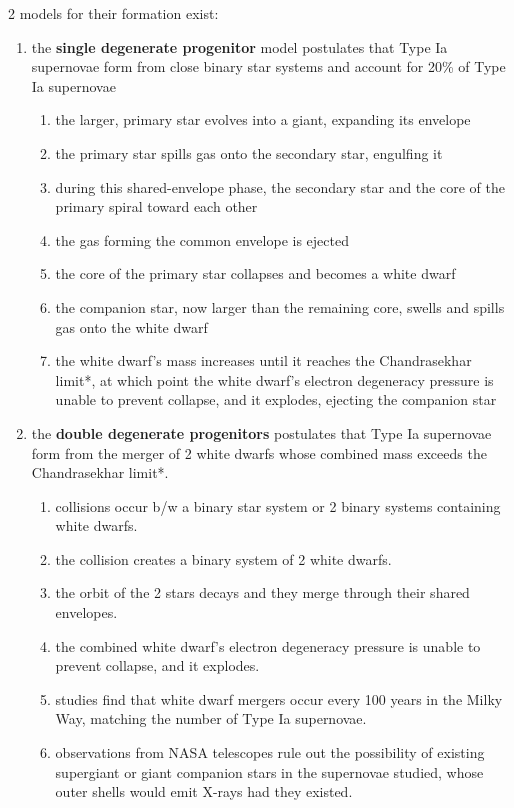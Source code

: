 2 models for their formation exist:
\begin{enumerate}
	\item the \textbf{single degenerate progenitor} model postulates that Type Ia supernovae form from close binary star systems and account for 20\% of Type Ia supernovae
		\begin{enumerate}
			\item the larger, primary star evolves into a giant, expanding its envelope
			\item the primary star spills gas onto the secondary star, engulfing it
			\item during this shared-envelope phase, the secondary star and the core of the primary spiral toward each other
			\item the gas forming the common envelope is ejected
			\item the core of the primary star collapses and becomes a white dwarf
			\item the companion star, now larger than the remaining core, swells and spills gas onto the white dwarf
			\item the white dwarf's mass increases until it reaches the \gls{Chandrasekhar limit}*, at which point the white dwarf's electron degeneracy pressure is unable to prevent collapse, and it explodes, ejecting the companion star
		\end{enumerate}
	\item the \textbf{double degenerate progenitors} postulates that Type Ia supernovae form from the merger of 2 white dwarfs whose combined mass exceeds the \gls{Chandrasekhar limit}*.
		\begin{enumerate}
			\item collisions occur b/w a binary star system or 2 binary systems containing white dwarfs.
			\item the collision creates a binary system of 2 white dwarfs.
			\item the orbit of the 2 stars decays and they merge through their shared envelopes.
			\item the combined white dwarf's electron degeneracy pressure is unable to prevent collapse, and it explodes.
			\item studies find that white dwarf mergers occur every 100 years in the Milky Way, matching the number of Type Ia supernovae.
			\item observations from NASA telescopes rule out the possibility of existing supergiant or giant companion stars in the supernovae studied, whose outer shells would emit X-rays had they existed.
		\end{enumerate} 
\end{enumerate}
